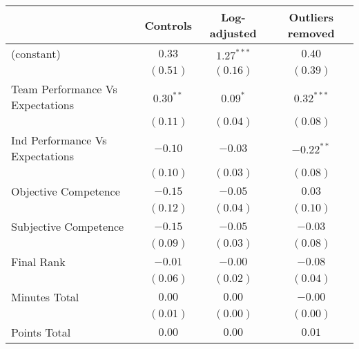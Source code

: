 
\begin{table}
\begin{center}
\begin{tabular}{l c c c }
\toprule
 & Controls & Log-adjusted & Outliers removed \\
\midrule
(constant)                                 & $0.33$               & $\mathbf{1.27}^{***}$ & $0.40$                \\
                                           & $(0.51)$             & $(0.16)$              & $(0.39)$              \\
Team Performance Vs Expectations           & $\mathbf{0.30}^{**}$ & $\mathbf{0.09}^{*}$   & $\mathbf{0.32}^{***}$ \\
                                           & $(0.11)$             & $(0.04)$              & $(0.08)$              \\
Ind Performance Vs Expectations            & $-0.10$              & $-0.03$               & $\mathbf{-0.22}^{**}$ \\
                                           & $(0.10)$             & $(0.03)$              & $(0.08)$              \\
Objective Competence                       & $-0.15$              & $-0.05$               & $0.03$                \\
                                           & $(0.12)$             & $(0.04)$              & $(0.10)$              \\
Subjective Competence                      & $-0.15$              & $-0.05$               & $-0.03$               \\
                                           & $(0.09)$             & $(0.03)$              & $(0.08)$              \\
Final Rank                                 & $-0.01$              & $-0.00$               & $-0.08$               \\
                                           & $(0.06)$             & $(0.02)$              & $(0.04)$              \\
Minutes Total                              & $0.00$               & $0.00$                & $-0.00$               \\
                                           & $(0.01)$             & $(0.00)$              & $(0.00)$              \\
Points Total                               & $0.00$               & $0.00$                & $0.01$                \\

\end{tabular}
\end{center}
\end{table}
